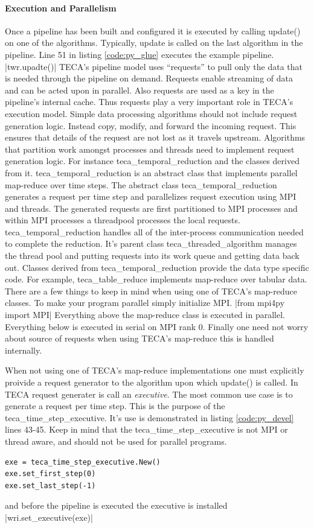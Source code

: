 \documentclass[a4paper,10pt,DIV=12]{scrreprt}
\begin{document}
\paragraph{Execution and Parallelism}
Once a pipeline has been built and configured it is executed by calling update() on one of the algorithms. Typically, update is called on the last algorithm in the pipeline. Line 51 in listing \ref{code:py_glue} executes the example pipeline. |twr.upadte()| TECA's pipeline model uses ``requests'' to pull only the data that is needed through the pipeline on demand. Requests enable streaming of data and can be acted upon in parallel. Also requests are used as a key in the pipeline's internal cache. Thus requests play a very important role in TECA's execution model. Simple data processing algorithms should not include request generation logic. Instead copy, modify, and forward the incoming request. This ensures that details of the request are not lost as it travels upstream. Algorithms that partition work amongst processes and threads need to implement request generation logic. For instance teca\_temporal\_reduction and the classes derived from it. teca\_temporal\_reduction is an abstract class that implements parallel map-reduce over time steps. The abstract class teca\_temporal\_reduction generates a request per time step and parallelizes request execution using MPI and threads. The generated requests are first partitioned to MPI processes and within MPI processes a threadpool processes the local requests. teca\_temporal\_reduction handles all of the inter-process communication needed to complete the reduction. It's parent class teca\_threaded\_algorithm manages the thread pool and putting requests into its work queue and getting data back out. Classes derived from teca\_temporal\_reduction provide the data type specific code. For example, teca\_table\_reduce implements map-reduce over tabular data. There are a few things to keep in mind when using one of TECA's map-reduce classes. To make your program parallel simply initialize MPI. |from mpi4py import MPI| Everything above the map-reduce class is executed in parallel. Everything below is executed in serial on MPI rank 0. Finally one need not worry about source of requests when using TECA's map-reduce this is handled internally.

When not using one of TECA's map-reduce implementations one must explicitly proivide a request generator to the algorithm upon which update() is called. In TECA request generater is call an \emph{executive}. The most common use case is to generate a request per time step. This is the purpose of the teca\_time\_step\_executive. It's use is demonstrated in listing \ref{code:py_devel} lines 43-45. Keep in mind that the teca\_time\_step\_executive is not MPI or thread aware, and should not be used for parallel programs.
\begin{verbatim}
exe = teca_time_step_executive.New()
exe.set_first_step(0)
exe.set_last_step(-1)
\end{verbatim}
and before the pipeline is executed the executive is installed |wri.set_executive(exe)|
\end{document}
